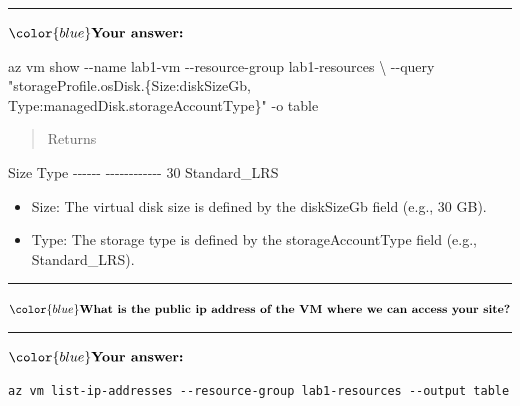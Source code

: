 \documentclass[11pt]{article}
\providecommand{\tightlist}{%
      \setlength{\itemsep}{0pt}\setlength{\parskip}{0pt}}
\newenvironment{Shaded}{}{}
\newcommand{\DataTypeTok}[1]{\textcolor[rgb]{0.56,0.13,0.00}{{#1}}}
\newcommand{\DecValTok}[1]{\textcolor[rgb]{0.25,0.63,0.44}{{#1}}}
\newcommand{\StringTok}[1]{\textcolor[rgb]{0.25,0.44,0.63}{{#1}}}
\newcommand{\FunctionTok}[1]{\textcolor[rgb]{0.02,0.16,0.49}{{#1}}}
\newcommand{\NormalTok}[1]{{#1}}
\newcommand{\OperatorTok}[1]{\textcolor[rgb]{0.40,0.40,0.40}{{#1}}}
\newcommand{\ExtensionTok}[1]{{#1}}
\newcommand{\AttributeTok}[1]{\textcolor[rgb]{0.49,0.56,0.16}{{#1}}}
\begin{document}
\begin{center}\rule{0.5\linewidth}{0.5pt}\end{center}

\(\color{blue} \textbf{Your answer:}\)

\begin{Shaded}
\begin{Highlighting}[]
\ExtensionTok{az}\NormalTok{ vm show }\AttributeTok{{-}{-}name}\NormalTok{ lab1{-}vm }\AttributeTok{{-}{-}resource{-}group}\NormalTok{ lab1{-}resources }\DataTypeTok{\textbackslash{}}
\NormalTok{{-}{-}query }\StringTok{"storageProfile.osDisk.\{Size:diskSizeGb, Type:managedDisk.storageAccountType\}"} \AttributeTok{{-}o}\NormalTok{ table}
\end{Highlighting}
\end{Shaded}

\begin{quote}
Returns
\end{quote}

\begin{Shaded}
\begin{Highlighting}[]
\NormalTok{Size    }\FunctionTok{Type}
\OperatorTok{{-}{-}{-}{-}{-}{-}}  \OperatorTok{{-}{-}{-}{-}{-}{-}{-}{-}{-}{-}{-}{-}}
\DecValTok{30}\NormalTok{      Standard\_LRS}
\end{Highlighting}
\end{Shaded}

\begin{itemize}
\tightlist
\item
  Size: The virtual disk size is defined by the diskSizeGb field (e.g.,
  30 GB).
\item
  Type: The storage type is defined by the storageAccountType field
  (e.g., Standard\_LRS).
\end{itemize}

\begin{center}\rule{0.5\linewidth}{0.5pt}\end{center}

\(\color{blue}\textbf{What is the public ip address of the VM where we can access your site?}\)

\begin{center}\rule{0.5\linewidth}{0.5pt}\end{center}

\(\color{blue} \textbf{Your answer:}\)

\begin{verbatim}
az vm list-ip-addresses --resource-group lab1-resources --output table
\end{verbatim}
\end{document}
